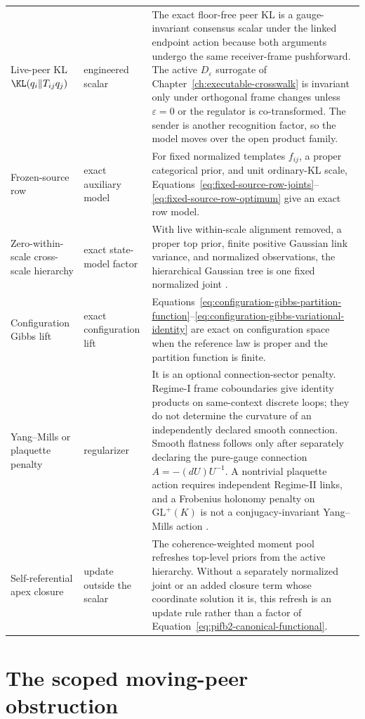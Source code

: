 \begin{longtable}{>{\raggedright\arraybackslash}p{}>{\raggedright\arraybackslash}p{}>{\raggedright\arraybackslash}p{}}
Live-peer KL \(\KL(q_i\Vert T_{ij}q_j)\) &
engineered scalar &
The exact floor-free peer KL is a gauge-invariant consensus scalar under the linked endpoint action because both arguments undergo the same receiver-frame pushforward. The active \(D_\varepsilon\) surrogate of Chapter~\ref{ch:executable-crosswalk} is invariant only under orthogonal frame changes unless \(\varepsilon=0\) or the regulator is co-transformed. The sender is another recognition factor, so the model moves over the open product family.\\
Frozen-source row &
exact auxiliary model &
For fixed normalized templates \(f_{ij}\), a proper categorical prior, and unit ordinary-KL scale, Equations~\eqref{eq:fixed-source-row-joints}--\eqref{eq:fixed-source-row-optimum} give an exact row model.\\
Zero-within-scale cross-scale hierarchy &
exact state-model factor &
With live within-scale alignment removed, a proper top prior, finite positive Gaussian link variance, and normalized observations, the hierarchical Gaussian tree is one fixed normalized joint \citep{Lauritzen1996}.\\
Configuration Gibbs lift &
exact configuration lift &
Equations~\eqref{eq:configuration-gibbs-partition-function}--\eqref{eq:configuration-gibbs-variational-identity} are exact on configuration space when the reference law is proper and the partition function is finite.\\
Yang--Mills or plaquette penalty &
regularizer &
It is an optional connection-sector penalty. Regime-I frame coboundaries give identity products on same-context discrete loops; they do not determine the curvature of an independently declared smooth connection. Smooth flatness follows only after separately declaring the pure-gauge connection \(A=-(dU)U^{-1}\). A nontrivial plaquette action requires independent Regime-II links, and a Frobenius holonomy penalty on \(\mathrm{GL}^{+}(K)\) is not a conjugacy-invariant Yang--Mills action \citep{Yang1954,Nakahara2003}.\\
Self-referential apex closure &
update outside the scalar &
The coherence-weighted moment pool refreshes top-level priors from the active hierarchy. Without a separately normalized joint or an added closure term whose coordinate solution it is, this refresh is an update rule rather than a factor of Equation~\eqref{eq:pifb2-canonical-functional}.\\
\end{longtable}
\normalsize

\section{The scoped moving-peer obstruction}

